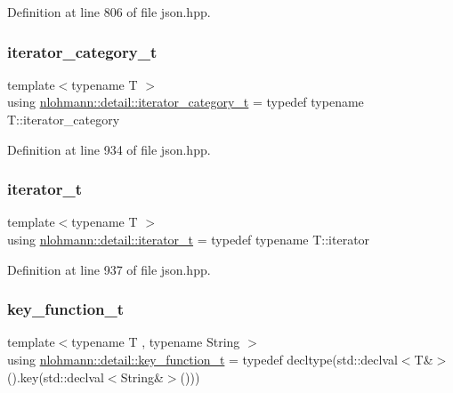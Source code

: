 Definition at line 806 of file json.\+hpp.

\mbox{\label{namespacenlohmann_1_1detail_ad22d2aa3aab018050ae519f6754366e1}} 
\subsubsection{\texorpdfstring{iterator\_category\_t}{iterator\_category\_t}}
{\footnotesize\ttfamily template$<$typename T $>$ \\
using \mbox{\hyperlink{namespacenlohmann_1_1detail_ad22d2aa3aab018050ae519f6754366e1}{nlohmann\+::detail\+::iterator\+\_\+category\+\_\+t}} = typedef typename T\+::iterator\+\_\+category}



Definition at line 934 of file json.\+hpp.

\mbox{\label{namespacenlohmann_1_1detail_a9ff93db146174305bce1bc4c54703e11}} 
\subsubsection{\texorpdfstring{iterator\_t}{iterator\_t}}
{\footnotesize\ttfamily template$<$typename T $>$ \\
using \mbox{\hyperlink{namespacenlohmann_1_1detail_a9ff93db146174305bce1bc4c54703e11}{nlohmann\+::detail\+::iterator\+\_\+t}} = typedef typename T\+::iterator}



Definition at line 937 of file json.\+hpp.

\mbox{\label{namespacenlohmann_1_1detail_a44869ca9f422b260625d78e4e8121559}} 
\subsubsection{\texorpdfstring{key\_function\_t}{key\_function\_t}}
{\footnotesize\ttfamily template$<$typename T , typename String $>$ \\
using \mbox{\hyperlink{namespacenlohmann_1_1detail_a44869ca9f422b260625d78e4e8121559}{nlohmann\+::detail\+::key\+\_\+function\+\_\+t}} = typedef decltype(std\+::declval$<$T\&$>$().key(std\+::declval$<$String\&$>$()))}



